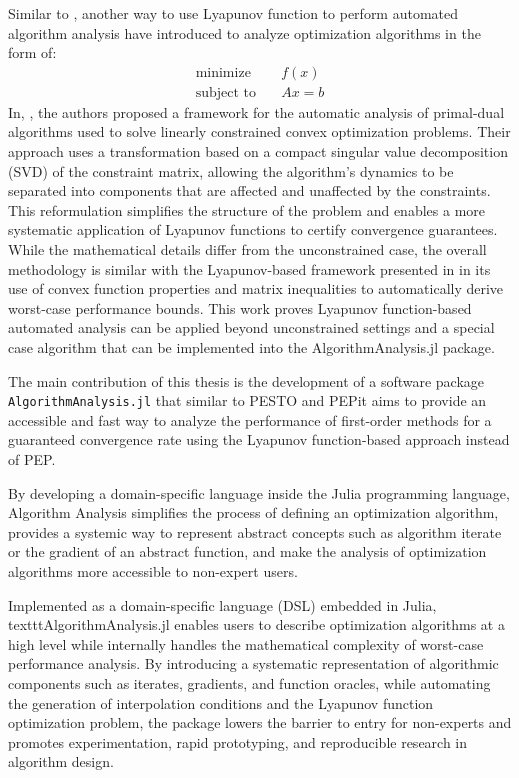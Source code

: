 Similar to \cite{tutorial}, another way to use Lyapunov function to perform automated algorithm analysis have introduced to analyze optimization algorithms in the form of:
\begin{subequations}\label{linearly_constrained}
    \begin{align*}
      \textrm{minimize} &\quad f(x) \\
      \textrm{subject to} &\quad Ax = b 
    \end{align*}
  \end{subequations}
In, \cite{primaldual}, the authors proposed a framework for the automatic analysis of primal-dual algorithms used to solve linearly constrained convex optimization problems. Their approach uses a transformation based on a compact singular value decomposition (SVD) of the constraint matrix, allowing the algorithm's dynamics to be separated into components that are affected and unaffected by the constraints. This reformulation simplifies the structure of the problem and enables a more systematic application of Lyapunov functions to certify convergence guarantees. While the mathematical details differ from the unconstrained case, the overall methodology is similar with the Lyapunov-based framework presented in \cite{tutorial} in its use of convex function properties and matrix inequalities to automatically derive worst-case performance bounds. This work proves Lyapunov function-based automated analysis can be applied beyond unconstrained settings and a special case algorithm that can be implemented into the AlgorithmAnalysis.jl package.

The main contribution of this thesis is the development of a software package \texttt{AlgorithmAnalysis.jl} that similar to PESTO and PEPit aims to provide an accessible and fast way to analyze the performance of first-order methods for a guaranteed convergence rate using the Lyapunov function-based approach instead of PEP.

By developing a domain-specific language inside the Julia programming language, Algorithm Analysis simplifies the process of defining an optimization algorithm, provides a systemic way to represent abstract concepts such as algorithm iterate or the gradient of an abstract function, and make the analysis of optimization algorithms more accessible to non-expert users.

Implemented as a domain-specific language (DSL) embedded in Julia, texttt{AlgorithmAnalysis.jl} enables users to describe optimization algorithms at a high level while internally handles the mathematical complexity of worst-case performance analysis. By introducing a systematic representation of algorithmic components such as iterates, gradients, and function oracles, while automating the generation of interpolation conditions and the Lyapunov function optimization problem, the package lowers the barrier to entry for non-experts and promotes experimentation, rapid prototyping, and reproducible research in algorithm design.

